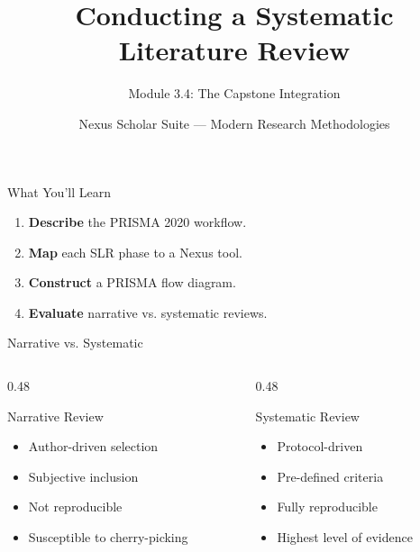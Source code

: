 \documentclass[aspectratio=169]{beamer}
\title{Conducting a Systematic Literature Review}
\subtitle{Module 3.4: The Capstone Integration}
\author{Nexus Scholar Suite --- Modern Research Methodologies}
\date{}
\begin{document}
\begin{frame}[plain]
  \titlepage
\end{frame}

\begin{frame}{What You'll Learn}
  \begin{enumerate}
    \item \textbf{Describe} the PRISMA 2020 workflow.
    \item \textbf{Map} each SLR phase to a Nexus tool.
    \item \textbf{Construct} a PRISMA flow diagram.
    \item \textbf{Evaluate} narrative vs. systematic reviews.
  \end{enumerate}
\end{frame}

\begin{frame}{Narrative vs. Systematic}
  \begin{columns}[T]
    \begin{column}{0.48\textwidth}
      \begin{alertblock}{Narrative Review}
        \begin{itemize}
          \item Author-driven selection
          \item Subjective inclusion
          \item Not reproducible
          \item Susceptible to cherry-picking
        \end{itemize}
      \end{alertblock}
    \end{column}
    \begin{column}{0.48\textwidth}
      \begin{exampleblock}{Systematic Review}
        \begin{itemize}
          \item Protocol-driven
          \item Pre-defined criteria
          \item Fully reproducible
          \item Highest level of evidence
        \end{itemize}
      \end{exampleblock}
    \end{column}
  \end{columns}
\end{frame}
\end{document}
